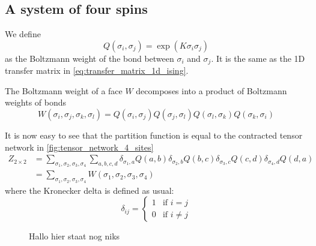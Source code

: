 
\subsection{A system of four spins}

We define
\begin{equation}
  Q(\sigma_i, \sigma_j) = \exp(K \sigma_i \sigma_j)
\end{equation}
as the Boltzmann weight of the bond between $\sigma_i$ and $\sigma_j$. It is the
same as the 1D transfer matrix in \autoref{eq:transfer_matrix_1d_ising}.

The Boltzmann weight of a face $W$ decomposes into a product of Boltzmann weights of
bonds
\begin{equation}
  W(\sigma_i, \sigma_j, \sigma_k, \sigma_l) =
  Q(\sigma_i, \sigma_j)Q(\sigma_j, \sigma_l)Q(\sigma_l, \sigma_k)Q(\sigma_k, \sigma_i)
\end{equation}

It is now easy to see that the partition function is equal to the contracted tensor
network in \autoref{fig:tensor_network_4_sites}
\begin{equation}
  \begin{split}
    Z_{2 \times 2} & =
    \sum_{\sigma_1, \sigma_2, \sigma_3, \sigma_4} \sum_{a, b, c, d}
    \delta_{\sigma_1, a} Q(a, b) \delta_{\sigma_2, b} Q(b, c)
    \delta_{\sigma_3, c} Q(c, d) \delta_{\sigma_4, d} Q(d, a) \\
    & =
    \sum_{\sigma_1, \sigma_2, \sigma_3, \sigma_4} W(\sigma_1, \sigma_2, \sigma_3, \sigma_4)
  \end{split}
\end{equation}
where the Kronecker delta is defined as usual:
\begin{equation}
  \delta_{i j} =
  \begin{cases}
    1 & \text{if } i = j \\
    0 & \text{if } i \neq j
  \end{cases}
\end{equation}

\begin{figure}
  \caption{Hallo hier staat nog niks}
  \label{fig:tensor_network_4_sites}
\end{figure}


